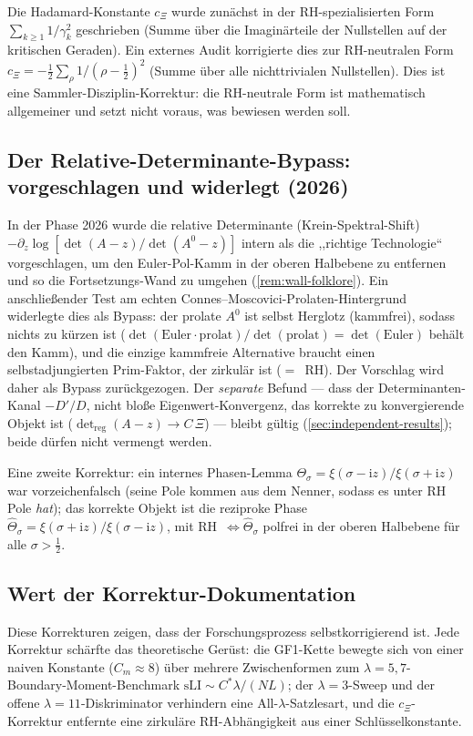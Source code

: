 \documentclass[12pt,a4paper]{article}
\theoremstyle{definition}
\theoremstyle{remark}
\begin{document}
Die Hadamard-Konstante $c_\Xi$ wurde zunächst in der RH-spezialisierten
Form $\sum_{k\geq 1} 1/\gamma_k^2$ geschrieben (Summe über die
Imaginärteile der Nullstellen auf der kritischen Geraden). Ein externes
Audit korrigierte dies zur RH-neutralen Form
$c_\Xi = -\tfrac{1}{2}\sum_\rho 1/(\rho-\tfrac{1}{2})^2$
(Summe über alle nichttrivialen Nullstellen). Dies ist eine
Sammler-Disziplin-Korrektur: die RH-neutrale Form ist mathematisch
allgemeiner und setzt nicht voraus, was bewiesen werden soll.


\subsection{Der Relative-Determinante-Bypass: vorgeschlagen und widerlegt (2026)}

In der Phase 2026 wurde die relative Determinante (Krein-Spektral-Shift)
$-\partial_z\log[\det(A-z)/\det(A^0-z)]$ intern als die ,,richtige Technologie``
vorgeschlagen, um den Euler-Pol-Kamm in der oberen Halbebene zu entfernen und so die
Fortsetzungs-Wand zu umgehen (\cref{rem:wall-folklore}). Ein anschließender Test am
echten Connes--Moscovici-Prolaten-Hintergrund widerlegte dies als Bypass: der
prolate $A^0$ ist selbst Herglotz (kammfrei), sodass nichts zu kürzen ist
($\det(\text{Euler}\cdot\text{prolat})/\det(\text{prolat})=\det(\text{Euler})$ behält
den Kamm), und die einzige kammfreie Alternative braucht einen selbstadjungierten
Prim-Faktor, der zirkulär ist ($=$~RH). Der Vorschlag wird daher als Bypass
zurückgezogen. Der \emph{separate} Befund --- dass der Determinanten-Kanal $-D'/D$,
nicht bloße Eigenwert-Konvergenz, das korrekte zu konvergierende Objekt ist
($\det_{\mathrm{reg}}(A-z)\to C\,\Xi$) --- bleibt gültig
(\cref{sec:independent-results}); beide dürfen nicht vermengt werden.

Eine zweite Korrektur: ein internes Phasen-Lemma
$\Theta_\sigma=\xi(\sigma-\mathrm{i}z)/\xi(\sigma+\mathrm{i}z)$ war vorzeichenfalsch
(seine Pole kommen aus dem Nenner, sodass es unter RH Pole \emph{hat}); das korrekte
Objekt ist die reziproke Phase
$\widehat\Theta_\sigma=\xi(\sigma+\mathrm{i}z)/\xi(\sigma-\mathrm{i}z)$, mit
RH~$\Leftrightarrow\widehat\Theta_\sigma$ polfrei in der oberen Halbebene für alle
$\sigma>\tfrac12$.


\subsection{Wert der Korrektur-Dokumentation}

Diese Korrekturen zeigen, dass der Forschungsprozess selbstkorrigierend
ist. Jede Korrektur schärfte das theoretische Gerüst: die GF1-Kette
bewegte sich von einer naiven Konstante ($C_m \approx 8$) über mehrere
Zwischenformen zum $\lambda=5,7$-Boundary-Moment-Benchmark
$\mathrm{sLI} \sim C^*\lambda/(NL)$; der $\lambda=3$-Sweep und der offene
$\lambda=11$-Diskriminator verhindern eine All-$\lambda$-Satzlesart, und die $c_\Xi$-Korrektur entfernte eine
zirkuläre RH-Abhängigkeit aus einer Schlüsselkonstante.
\end{document}
